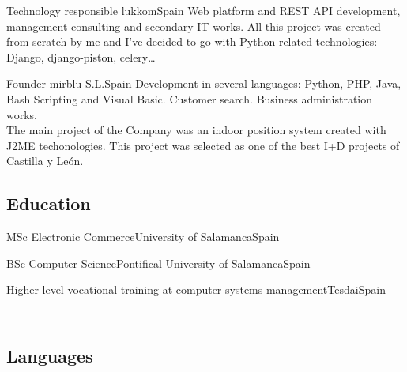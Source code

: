\documentclass[11pt, a4paper, sans]{moderncv}
\begin{document}
{Technology responsible}
{lukkom}{Spain}{}
{Web platform and REST API development, management consulting and secondary IT
works. All this project was created from scratch by me and I've decided to go
with Python related technologies: Django, django-piston, celery\ldots\\}

{Founder}
{mirblu S.L.}{Spain}{}
{Development in several languages: Python, PHP, Java, Bash Scripting and Visual
Basic. Customer search. Business administration works.\\The main project of the
Company was an indoor position system created with J2ME techonologies. This
project was selected as one of the best I+D projects of Castilla y León.\\}


%
%

\subsection{Education}
{MSc Electronic Commerce}{University of Salamanca}{Spain}{}{}

{BSc Computer Science}{Pontifical University of Salamanca}{Spain}{}{}

{Higher level vocational training at computer systems management}{Tesdai}{Spain}{}{}

%
%

\subsection{\\Languages}
\end{document}

